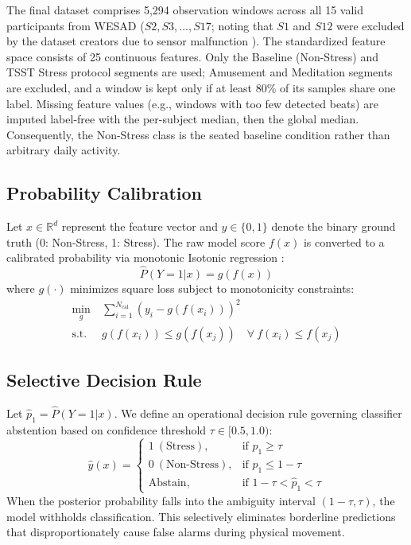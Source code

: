 \documentclass[conference]{IEEEtran}
\begin{document}
The final dataset comprises 5,294 observation windows across all 15 valid participants from WESAD ($S2, S3, \dots, S17$; noting that $S1$ and $S12$ were excluded by the dataset creators due to sensor malfunction \cite{schmidt2018wesad}). The standardized feature space consists of 25 continuous features. Only the Baseline (Non-Stress) and TSST Stress protocol segments are used; Amusement and Meditation segments are excluded, and a window is kept only if at least 80\% of its samples share one label. Missing feature values (e.g., windows with too few detected beats) are imputed label-free with the per-subject median, then the global median. Consequently, the Non-Stress class is the seated baseline condition rather than arbitrary daily activity.

\subsection{Probability Calibration}
Let $x \in \mathbb{R}^d$ represent the feature vector and $y \in \{0, 1\}$ denote the binary ground truth (0: Non-Stress, 1: Stress). The raw model score $f(x)$ is converted to a calibrated probability via monotonic Isotonic regression \cite{zadrozny2002transforming, niculescu2005predicting}:
\begin{equation}
\hat{P}(Y=1|x) = g(f(x))
\end{equation}
where $g(\cdot)$ minimizes square loss subject to monotonicity constraints:
\begin{equation}
\begin{aligned}
\min_{g} \ & \sum_{i=1}^{N_{\text{cal}}} \left( y_i - g(f(x_i)) \right)^2 \\
\text{s.t.} \ & g(f(x_i)) \le g(f(x_j)) \quad \forall \ f(x_i) \le f(x_j)
\end{aligned}
\end{equation}

\subsection{Selective Decision Rule}
Let $\hat{p}_1 = \hat{P}(Y=1|x)$. We define an operational decision rule governing classifier abstention based on confidence threshold $\tau \in [0.5, 1.0)$:
\begin{equation}
\hat{y}(x) =
\begin{cases}
1 \ (\text{Stress}), & \text{if } \hat{p}_1 \ge \tau \\
0 \ (\text{Non-Stress}), & \text{if } \hat{p}_1 \le 1 - \tau \\
\text{Abstain}, & \text{if } 1 - \tau < \hat{p}_1 < \tau
\end{cases}
\end{equation}
When the posterior probability falls into the ambiguity interval $(1-\tau, \tau)$, the model withholds classification. This selectively eliminates borderline predictions that disproportionately cause false alarms during physical movement.
\end{document}
